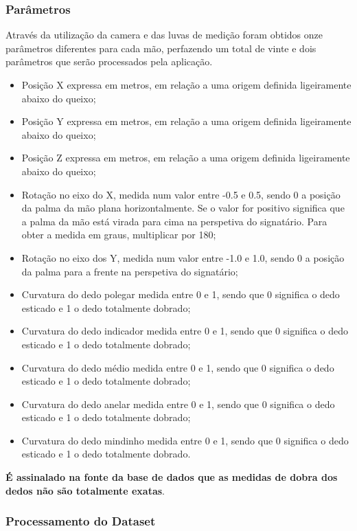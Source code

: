 \documentclass[10pt,a4paper]{article}
\begin{document}
\subsubsection{Parâmetros}

Através da utilização da camera e das luvas de medição foram obtidos onze parâmetros diferentes para cada mão, perfazendo um total de vinte e dois parâmetros que serão processados pela aplicação.

\begin{itemize}
\item Posição X expressa em metros, em relação a uma origem definida ligeiramente abaixo do queixo;
\item Posição Y expressa em metros, em relação a uma origem definida ligeiramente abaixo do queixo;
\item Posição Z expressa em metros, em relação a uma origem definida ligeiramente abaixo do queixo;
\item Rotação no eixo do X, medida num valor entre -0.5 e 0.5, sendo 0 a posição da palma da mão plana horizontalmente. Se o valor for positivo significa que a palma da mão está virada para cima na perspetiva do signatário. Para obter a medida em graus, multiplicar por 180;
\item Rotação no eixo dos Y, medida num valor entre -1.0 e 1.0, sendo 0 a posição da palma para a frente na perspetiva do signatário;
\item Curvatura do dedo polegar medida entre 0 e 1, sendo que 0 significa o dedo esticado e 1 o dedo totalmente dobrado;
\item Curvatura do dedo indicador medida entre 0 e 1, sendo que 0 significa o dedo esticado e 1 o dedo totalmente dobrado;
\item Curvatura do dedo médio medida entre 0 e 1, sendo que 0 significa o dedo esticado e 1 o dedo totalmente dobrado;
\item Curvatura do dedo anelar medida entre 0 e 1, sendo que 0 significa o dedo esticado e 1 o dedo totalmente dobrado;
\item Curvatura do dedo mindinho medida entre 0 e 1, sendo que 0 significa o dedo esticado e 1 o dedo totalmente dobrado.
\end{itemize}
\textbf{É assinalado na fonte da base de dados que as medidas de dobra dos dedos não são totalmente exatas}.

\subsubsection{Processamento do Dataset}
\end{document}
